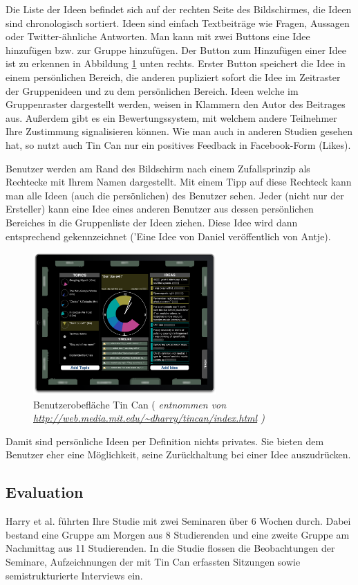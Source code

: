 Die Liste der Ideen befindet sich auf der rechten Seite des Bildschirmes, die
Ideen sind chronologisch sortiert. Ideen sind einfach Textbeiträge wie Fragen,
Aussagen oder Twitter-ähnliche Antworten. Man kann mit zwei Buttons eine Idee
hinzufügen bzw. zur Gruppe hinzufügen. Der Button zum Hinzufügen einer Idee ist
zu erkennen in Abbildung \ref{tincan_ui} unten rechts. Erster Button speichert
die Idee in einem persönlichen Bereich, die anderen pupliziert sofort die Idee
im Zeitraster der Gruppenideen und zu dem persönlichen Bereich. Ideen welche im
Gruppenraster dargestellt werden, weisen in Klammern den Autor des Beitrages
aus. Außerdem gibt es ein Bewertungssystem, mit welchem andere Teilnehmer Ihre
Zustimmung signalisieren können. Wie man auch in anderen Studien gesehen hat, so
nutzt auch Tin Can nur ein positives Feedback in Facebook-Form (Likes).

Benutzer werden am Rand des Bildschirm nach einem Zufallsprinzip als Rechtecke
mit Ihrem Namen dargestellt. Mit einem Tipp auf diese Rechteck kann man alle
Ideen (auch die persönlichen) des Benutzer sehen. Jeder (nicht nur der
Ersteller) kann eine Idee eines anderen Benutzer aus dessen persönlichen
Bereiches in die Gruppenliste der Ideen ziehen. Diese Idee wird dann
entsprechend gekennzeichnet ('Eine Idee von Daniel veröffentlich von Antje).

\begin{figure}[htp]
\centering
\includegraphics[width=7cm]{tincan_ui.png}
\caption{Benutzerobefläche Tin Can ( \em {entnommen von \url {http://web.media.mit.edu/~dharry/tincan/index.html}} )}
\label{tincan_ui}
\end{figure}

Damit sind persönliche Ideen per Definition nichts privates. Sie bieten dem
Benutzer eher eine Möglichkeit, seine Zurückhaltung bei einer Idee auszudrücken.


\subsection{Evaluation}
Harry et al. \cite{HarGorSch2012} führten Ihre Studie mit zwei Seminaren über 6 Wochen durch. Dabei
bestand eine Gruppe am Morgen aus 8 Studierenden und eine zweite Gruppe am
Nachmittag aus 11 Studierenden. In die Studie \cite{HarGorSch2012} flossen die Beobachtungen der
Seminare, Aufzeichnungen der mit Tin Can erfassten Sitzungen sowie
semistrukturierte Interviews ein.

